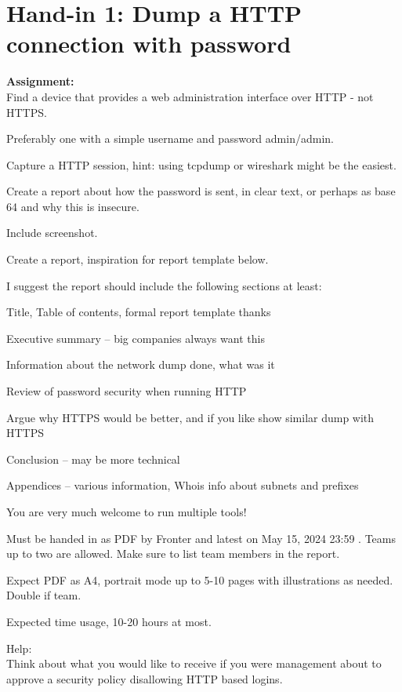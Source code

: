 \documentclass[a4paper,11pt,notitlepage]{report}
\begin{document}
\rm
{}

\newcommand{\course}[1]{KEA Kompetence Penetration Testing\\ exercises}




\setcounter{tocdepth}{0}

\normal

\chapter*{Hand-in 1: Dump a HTTP connection with password}

{\bf Assignment:}\\
Find a device that provides a web administration interface over HTTP - not HTTPS.

Preferably one with a simple username and password admin/admin.

Capture a HTTP session, hint: using tcpdump or wireshark might be the easiest.

Create a report about how the password is sent, in clear text, or perhaps as base 64 and why this is insecure.

Include screenshot.

Create a report, inspiration for report template below.

I suggest the report should include the following sections at least:
\begin{list2}
\item Title, Table of contents, formal report template thanks
\item Executive summary -- big companies always want this
\item Information about the network dump done, what was it
\item Review of password security when running HTTP
\item Argue why HTTPS would be better, and if you like show similar dump with HTTPS
\item Conclusion -- may be more technical
\item Appendices -- various information, Whois info about subnets and prefixes
\end{list2}

You are very much welcome to run multiple tools!

Must be handed in as PDF by Fronter and latest on May 15, 2024 23:59 . Teams up to two are allowed. Make sure to list team members in the report.

Expect PDF as A4, portrait mode up to 5-10 pages with illustrations as needed. Double if team.

Expected time usage, 10-20 hours at most.

Help:\\
Think about what you would like to receive if you were management about to approve a security policy disallowing HTTP based logins.
\end{document}
